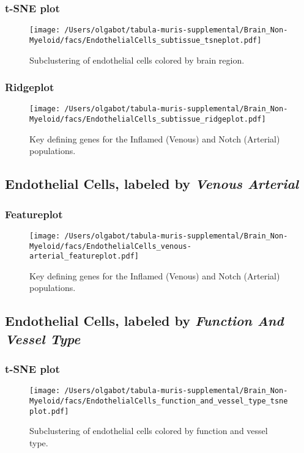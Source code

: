 \clearpage
\subsubsection{t-SNE plot}
\begin{figure}[h]
\centering
\texttt{[image: /Users/olgabot/tabula-muris-supplemental/Brain\_Non-Myeloid/facs/EndothelialCells\_subtissue\_tsneplot.pdf]}

\caption{Subclustering of endothelial cells colored by brain region.
}
\end{figure}


\clearpage

\subsubsection{Ridgeplot}
\begin{figure}[h]
\centering
\texttt{[image: /Users/olgabot/tabula-muris-supplemental/Brain\_Non-Myeloid/facs/EndothelialCells\_subtissue\_ridgeplot.pdf]}

\caption{Key defining genes for the Inflamed (Venous) and Notch (Arterial) populations.
}
\end{figure}


\clearpage

\subsection{Endothelial Cells, labeled by \emph{Venous Arterial}}

\clearpage
\subsubsection{Featureplot}
\begin{figure}[h]
\centering
\texttt{[image: /Users/olgabot/tabula-muris-supplemental/Brain\_Non-Myeloid/facs/EndothelialCells\_venous-arterial\_featureplot.pdf]}

\caption{Key defining genes for the Inflamed (Venous) and Notch (Arterial) populations.
}
\end{figure}


\clearpage

\subsection{Endothelial Cells, labeled by \emph{Function And Vessel Type}}

\clearpage
\subsubsection{t-SNE plot}
\begin{figure}[h]
\centering
\texttt{[image: /Users/olgabot/tabula-muris-supplemental/Brain\_Non-Myeloid/facs/EndothelialCells\_function\_and\_vessel\_type\_tsneplot.pdf]}

\caption{Subclustering of endothelial cells colored by function and vessel type.
}
\end{figure}


